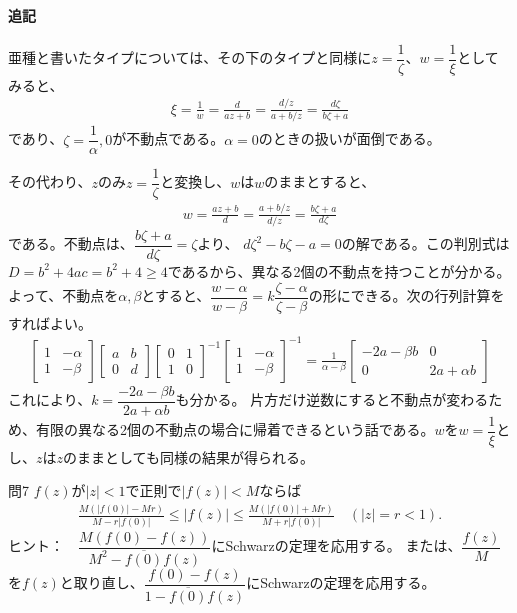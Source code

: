 \paragraph{追記}
亜種と書いたタイプについては、その下のタイプと同様に$z=\dfrac{1}{\zeta}$、$w=\dfrac{1}{\xi}$としてみると、
\begin{align*}
    \xi
    =\frac{1}{w}
    =\frac{d}{az+b}
    =\frac{d/z}{a+b/z}
    =\frac{d\zeta}{b\zeta+a}
\end{align*}
であり、$\zeta=\dfrac{1}{\alpha},0$が不動点である。$\alpha=0$のときの扱いが面倒である。

その代わり、$z$のみ$z=\dfrac{1}{\zeta}$と変換し、$w$は$w$のままとすると、
\begin{align*}
    w=\frac{az+b}{d}=\frac{a+b/z}{d/z}=\frac{b\zeta+a}{d\zeta}
\end{align*}
である。不動点は、$\dfrac{b\zeta+a}{d\zeta}=\zeta$より、
$d\zeta^2-b\zeta-a=0$の解である。この判別式は$D=b^2+4ac=b^2+4\ge4$であるから、異なる2個の不動点を持つことが分かる。よって、不動点を$\alpha,\beta$とすると、$\dfrac{w-\alpha}{w-\beta}=k\dfrac{\zeta-\alpha}{\zeta-\beta}$の形にできる。次の行列計算をすればよい。
\begin{align*}
    \begin{bmatrix}
        1&-\alpha\\1&-\beta
    \end{bmatrix}
    \begin{bmatrix}
        a&b\\0&d
    \end{bmatrix}
    \begin{bmatrix}
        0&1\\1&0
    \end{bmatrix}^{-1}
    \begin{bmatrix}
        1&-\alpha\\1&-\beta
    \end{bmatrix}^{-1}
    =\frac{1}{\alpha-\beta}
    \begin{bmatrix}
        -2a-\beta b&0\\0&2a+\alpha b
    \end{bmatrix}
\end{align*}
これにより、$k=\dfrac{-2a-\beta b}{2a+\alpha b}$も分かる。
片方だけ逆数にすると不動点が変わるため、有限の異なる2個の不動点の場合に帰着できるという話である。$w$を$w=\dfrac{1}{\xi}$とし、$z$は$z$のままとしても同様の結果が得られる。

\newpage
\begin{mysimplebox}{問7}
    $f(z)$が$|z|<1$で正則で$|f(z)|<M$ならば
    \begin{align*}
        \frac{M(|f(0)|-Mr)}{M-r|f(0)|}
        \le|f(z)|
        \le\frac{M(|f(0)|+Mr)}{M+r|f(0)|}
        \quad(|z|=r<1).
    \end{align*}
    ヒント：　$\dfrac{M(f(0)-f(z))}{M^2-\overline{f(0)}f(z)}$にSchwarzの定理を応用する。
    または、$\dfrac{f(z)}{M}$を$f(z)$と取り直し、$\dfrac{f(0)-f(z)}{1-\overline{f(0)}f(z)}$にSchwarzの定理を応用する。
\end{mysimplebox}
